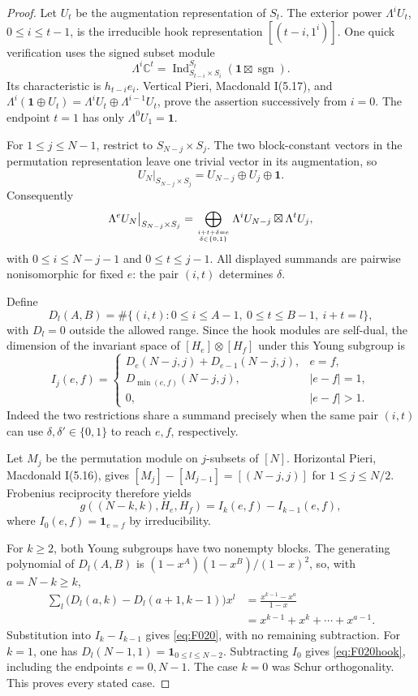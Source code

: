 \begin{proof}
Let \(U_t\) be the augmentation representation of \(S_t\).
The exterior power \(\Lambda^i U_t\), \(0\leq i\leq t-1\),
is the irreducible hook representation \([(t-i,1^i)]\).
One quick verification uses the signed subset module
\[
 \Lambda^i\mathbb C^t=
 \operatorname{Ind}_{S_{t-i}\times S_i}^{S_t}
                          (\mathbf1\boxtimes\operatorname{sgn}).
\]
Its characteristic is \(h_{t-i}e_i\). Vertical Pieri,
Macdonald I(5.17), and
\(\Lambda^i(\mathbf1\oplus U_t)
=\Lambda^i U_t\oplus\Lambda^{i-1}U_t\), prove the
assertion successively from \(i=0\). The endpoint \(t=1\)
has only \(\Lambda^0 U_1=\mathbf1\).

For \(1\leq j\leq N-1\), restrict to
\(S_{N-j}\times S_j\). The two block-constant vectors
in the permutation representation leave one trivial vector
in its augmentation, so
\[
 U_N\big|_{S_{N-j}\times S_j}
                  =U_{N-j}\oplus U_j\oplus\mathbf1.
\]
Consequently
\[
 \Lambda^e U_N\big|_{S_{N-j}\times S_j}
   =\bigoplus_{i+t+\delta=e\atop\delta\in\{0,1\}}
                        \Lambda^i U_{N-j}\boxtimes\Lambda^t U_j,
\]
with \(0\leq i\leq N-j-1\) and \(0\leq t\leq j-1\).
All displayed summands are pairwise nonisomorphic for fixed
\(e\): the pair \((i,t)\) determines \(\delta\).

Define
\[
 D_l(A,B)=\#\{(i,t):0\leq i\leq A-1,\ 0\leq t\leq B-1,
                                                 \ i+t=l\},
\]
with \(D_l=0\) outside the allowed range. Since the hook
modules are self-dual, the dimension of the invariant space
of \([H_e]\otimes[H_f]\) under this Young subgroup is
\[
 I_j(e,f)=
 \begin{cases}
 D_e(N-j,j)+D_{e-1}(N-j,j),&e=f,\\
 D_{\min(e,f)}(N-j,j),&|e-f|=1,\\
 0,&|e-f|>1.
 \end{cases}
\]
Indeed the two restrictions share a summand precisely when
the same pair \((i,t)\) can use \(\delta,\delta'\in\{0,1\}\)
to reach \(e,f\), respectively.

Let \(M_j\) be the permutation module on \(j\)-subsets
of \([N]\). Horizontal Pieri, Macdonald I(5.16), gives
\([M_j]-[M_{j-1}]=[(N-j,j)]\) for
\(1\leq j\leq N/2\). Frobenius reciprocity therefore yields
\[
                    g((N-k,k),H_e,H_f)=I_k(e,f)-I_{k-1}(e,f),
\]
where \(I_0(e,f)=\mathbf1_{e=f}\) by irreducibility.

For \(k\geq2\), both Young subgroups have two nonempty
blocks. The generating polynomial of \(D_l(A,B)\) is
\((1-x^A)(1-x^B)/(1-x)^2\), so, with \(a=N-k\geq k\),
\[
 \begin{split}
 \sum_l\bigl(D_l(a,k)-D_l(a+1,k-1)\bigr)x^l
   &=\frac{x^{k-1}-x^a}{1-x}\\
   &=x^{k-1}+x^k+\cdots+x^{a-1}.
 \end{split}
\]
Substitution into \(I_k-I_{k-1}\) gives
\eqref{eq:F020}, with no remaining subtraction.
For \(k=1\), one has
\(D_l(N-1,1)=\mathbf1_{0\leq l\leq N-2}\).
Subtracting \(I_0\) gives \eqref{eq:F020hook}, including
the endpoints \(e=0,N-1\). The case \(k=0\) was
Schur orthogonality. This proves every stated case.
\end{proof}


